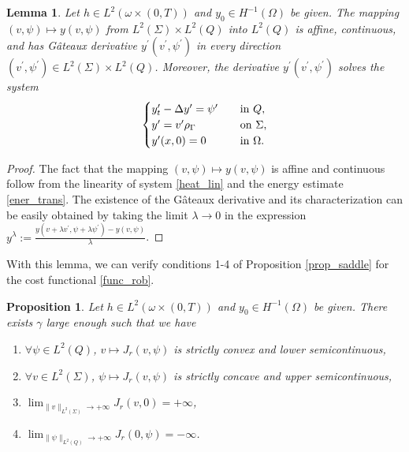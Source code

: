 \documentclass{dcds-bOF}
\newtheorem{lemma}[theorem]{Lemma}
\newtheorem{proposition}{Proposition}
\theoremstyle{definition}
\def\csbd{\rho_{\Gamma}}
\begin{document}
\begin{lemma}\label{lemma_prop_sol1}
Let $h\in L^2(\omega\times(0,T))$ and $y_0\in H^{-1}(\Omega)$ be given. The mapping $(v,\psi)\mapsto y(v,\psi)$ from $L^2(\Sigma)\times L^2(Q)$ into $L^2(Q)$ is affine, continuous, and has G\^{a}teaux derivative $y^\prime(v^\prime,\psi^\prime)$ in every direction $(v^\prime,\psi^\prime)\in L^2(\Sigma)\times L^2(Q)$. Moreover, the derivative $y^\prime(v^\prime,\psi^\prime)$ solves the system
%
\begin{equation}\label{deriv_sys1}
\begin{cases}
y^\prime_t-\Delta y^\prime=\psi^\prime \quad &\textnormal{in $Q$}, \\
y^\prime=v^\prime\csbd \quad &\textnormal{on $\Sigma$,} \\
y^\prime(x,0)=0 \quad &\textnormal{in $\Omega$}.
\end{cases}
\end{equation}
%
\end{lemma}

\begin{proof}
The fact that the mapping $(v,\psi)\mapsto y(v,\psi)$ is affine and continuous follow from the linearity of system \eqref{heat_lin} and the energy estimate \eqref{ener_trans}. The existence of the G\^{a}teaux derivative and its characterization can be easily obtained by taking the limit $\lambda\to 0$ in the expression $y^\lambda:=\frac{y(v+\lambda v^\prime,\psi+\lambda\psi^\prime)-y(v,\psi)}{\lambda}$.
%
\end{proof}

With this lemma, we can verify conditions 1-4 of Proposition \ref{prop_saddle} for the cost functional \eqref{func_rob}.
%
\begin{proposition}\label{verif_cond}
Let $h\in L^2(\omega\times(0,T))$ and $y_0\in H^{-1}(\Omega)$ be given. There exists $\gamma$ large enough such that we have
%
\begin{enumerate}
\item $\forall \psi\in L^2(Q)$, $v\mapsto J_r(v,\psi)$ is strictly convex and lower semicontinuous,
\item $\forall v\in L^2(\Sigma)$, $\psi\mapsto J_r(v,\psi)$ is strictly concave and upper semicontinuous,
\item $\lim_{\|v\|_{L^2(\Sigma)}\to+\infty}J_r(v,0)=+\infty$,
\item $\lim_{\|\psi\|_{L^2(Q)}\to+\infty}J_r(0,\psi)=-\infty$.
\end{enumerate}
%
\end{proposition}
%
\end{document}
